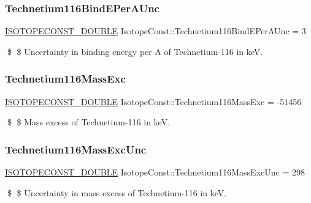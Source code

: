 \subsubsection{\texorpdfstring{Technetium116\+Bind\+E\+Per\+A\+Unc}{Technetium116BindEPerAUnc}}
{\footnotesize\ttfamily \mbox{\hyperlink{group___isotope_const-_macros_ga8f45a7272ce02c0b4c65c44636ed719a}{I\+S\+O\+T\+O\+P\+E\+C\+O\+N\+S\+T\+\_\+\+D\+O\+U\+B\+LE}} Isotope\+Const\+::\+Technetium116\+Bind\+E\+Per\+A\+Unc = 3}

\$ \$ Uncertainty in binding energy per A of Technetium-\/116 in keV. \mbox{\label{group___isotope_const-_technetium-_tc116_ga603671ff72dc35cb6478b32086bc1f44}} 
\subsubsection{\texorpdfstring{Technetium116\+Mass\+Exc}{Technetium116MassExc}}
{\footnotesize\ttfamily \mbox{\hyperlink{group___isotope_const-_macros_ga8f45a7272ce02c0b4c65c44636ed719a}{I\+S\+O\+T\+O\+P\+E\+C\+O\+N\+S\+T\+\_\+\+D\+O\+U\+B\+LE}} Isotope\+Const\+::\+Technetium116\+Mass\+Exc = -\/51456}

\$ \$ Mass excess of Technetium-\/116 in keV. \mbox{\label{group___isotope_const-_technetium-_tc116_gad7ab925ecb360bebc59c870f3219bb1b}} 
\subsubsection{\texorpdfstring{Technetium116\+Mass\+Exc\+Unc}{Technetium116MassExcUnc}}
{\footnotesize\ttfamily \mbox{\hyperlink{group___isotope_const-_macros_ga8f45a7272ce02c0b4c65c44636ed719a}{I\+S\+O\+T\+O\+P\+E\+C\+O\+N\+S\+T\+\_\+\+D\+O\+U\+B\+LE}} Isotope\+Const\+::\+Technetium116\+Mass\+Exc\+Unc = 298}

\$ \$ Uncertainty in mass excess of Technetium-\/116 in keV. \mbox{\label{group___isotope_const-_technetium-_tc116_ga392c337f0e47e8e5d272cf43a693b3a5}} 
